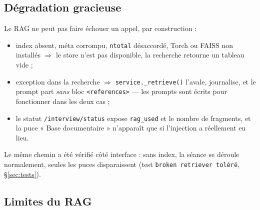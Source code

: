 \subsection{Dégradation gracieuse}
\label{sec:rag-degrade}

Le RAG ne peut pas faire échouer un appel, par construction :

\begin{itemize}[itemsep=2pt]
  \item index absent, méta corrompu, \texttt{ntotal} désaccordé, Torch ou FAISS
        non installés $\Rightarrow$ le store n'est pas disponible, la recherche
        retourne un tableau vide ;
  \item exception dans la recherche $\Rightarrow$ \texttt{service.\_retrieve()}
        l'avale, journalise, et le prompt part \emph{sans} bloc
        \texttt{<references>} --- les prompts sont écrits pour fonctionner dans
        les deux cas ;
  \item le statut \texttt{/interview/status} expose \texttt{rag\_used} et le
        nombre de fragments, et la puce « Base documentaire » n'apparaît que si
        l'injection a réellement eu lieu.
\end{itemize}

Le même chemin a été vérifié côté interface : sans index, la séance se déroule
normalement, seules les puces disparaissent (test \texttt{broken retriever
toléré}, §\ref{sec:tests}).

\subsection{Limites du RAG}
\label{sec:rag-limites}

